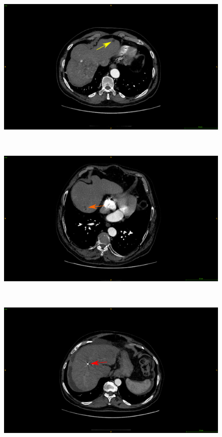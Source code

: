\begin{figure}[!ht]
	\centering
	\begin{minipage}{0.45\linewidth}
		\includegraphics[width=\linewidth]{../Contributions/images/Artifacts/ResizeGDB_cyst}
	\end{minipage} \\
	\begin{minipage}{0.45\linewidth}
		\includegraphics[width=\linewidth]{../Contributions/images/Artifacts/ResizeGDB_fat}
	\end{minipage} \\
	\begin{minipage}{0.45\linewidth}
		\includegraphics[width=\linewidth]{../Contributions/images/Artifacts/ResizeGDB_metallic_artifacts}

\end{minipage}
\end{figure}
